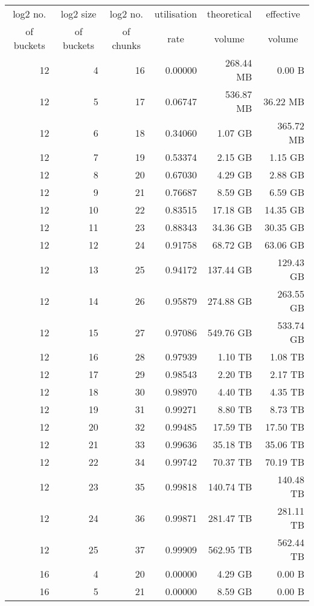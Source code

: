 \newpage

\begin{longtable}{rrrrrr}\toprule
\multicolumn{1}{c}{log2 no.}& 
\multicolumn{1}{c}{log2 size} & 
\multicolumn{1}{c}{log2 no.}&
\multicolumn{1}{c}{utilisation}&
\multicolumn{1}{c}{theoretical}&
\multicolumn{1}{c}{effective}\\
\multicolumn{1}{c}{of buckets}&
\multicolumn{1}{c}{of buckets}&
\multicolumn{1}{c}{of chunks}&
\multicolumn{1}{c}{rate}&
\multicolumn{1}{c}{volume}&
\multicolumn{1}{c}{volume}\\
\midrule
12 & 4 & 16 & 0.00000 & 268.44 MB & 0.00 B \\
12 & 5 & 17 & 0.06747 & 536.87 MB & 36.22 MB \\
12 & 6 & 18 & 0.34060 & 1.07 GB & 365.72 MB \\
12 & 7 & 19 & 0.53374 & 2.15 GB & 1.15 GB \\
12 & 8 & 20 & 0.67030 & 4.29 GB & 2.88 GB \\
12 & 9 & 21 & 0.76687 & 8.59 GB & 6.59 GB \\
12 & 10 & 22 & 0.83515 & 17.18 GB & 14.35 GB \\
12 & 11 & 23 & 0.88343 & 34.36 GB & 30.35 GB \\
12 & 12 & 24 & 0.91758 & 68.72 GB & 63.06 GB \\
12 & 13 & 25 & 0.94172 & 137.44 GB & 129.43 GB \\
12 & 14 & 26 & 0.95879 & 274.88 GB & 263.55 GB \\
12 & 15 & 27 & 0.97086 & 549.76 GB & 533.74 GB \\
12 & 16 & 28 & 0.97939 & 1.10 TB & 1.08 TB \\
12 & 17 & 29 & 0.98543 & 2.20 TB & 2.17 TB \\
12 & 18 & 30 & 0.98970 & 4.40 TB & 4.35 TB \\
12 & 19 & 31 & 0.99271 & 8.80 TB & 8.73 TB \\
12 & 20 & 32 & 0.99485 & 17.59 TB & 17.50 TB \\
12 & 21 & 33 & 0.99636 & 35.18 TB & 35.06 TB \\
12 & 22 & 34 & 0.99742 & 70.37 TB & 70.19 TB \\
12 & 23 & 35 & 0.99818 & 140.74 TB & 140.48 TB \\
12 & 24 & 36 & 0.99871 & 281.47 TB & 281.11 TB \\
12 & 25 & 37 & 0.99909 & 562.95 TB & 562.44 TB \\
16 & 4 & 20 & 0.00000 & 4.29 GB & 0.00 B \\
16 & 5 & 21 & 0.00000 & 8.59 GB & 0.00 B \\

\end{longtable}
